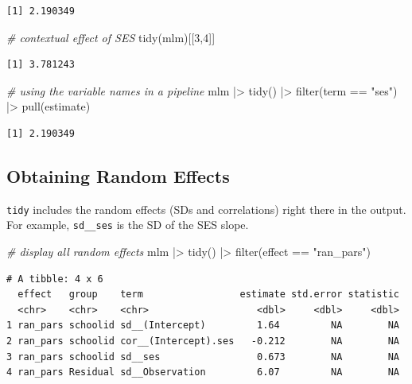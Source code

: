 \documentclass[
  letterpaper,
  DIV=11,
  numbers=noendperiod]{scrreprt}
\newenvironment{Shaded}{\begin{snugshade}}{\end{snugshade}}
\newcommand{\CommentTok}[1]{\textcolor[rgb]{0.38,0.63,0.69}{\textit{#1}}}
\newcommand{\DecValTok}[1]{\textcolor[rgb]{0.25,0.63,0.44}{#1}}
\newcommand{\FunctionTok}[1]{\textcolor[rgb]{0.02,0.16,0.49}{#1}}
\newcommand{\NormalTok}[1]{\textcolor[rgb]{0.00,0.44,0.13}{#1}}
\newcommand{\SpecialCharTok}[1]{\textcolor[rgb]{0.25,0.44,0.63}{#1}}
\newcommand{\StringTok}[1]{\textcolor[rgb]{0.25,0.44,0.63}{#1}}
\begin{document}
\begin{verbatim}
[1] 2.190349
\end{verbatim}

\begin{Shaded}
\begin{Highlighting}[]
\CommentTok{\# contextual effect of SES}
\FunctionTok{tidy}\NormalTok{(mlm)[[}\DecValTok{3}\NormalTok{,}\DecValTok{4}\NormalTok{]]}
\end{Highlighting}
\end{Shaded}

\begin{verbatim}
[1] 3.781243
\end{verbatim}

\begin{Shaded}
\begin{Highlighting}[]
\CommentTok{\# using the variable names in a pipeline}
\NormalTok{mlm }\SpecialCharTok{|\textgreater{}} 
  \FunctionTok{tidy}\NormalTok{() }\SpecialCharTok{|\textgreater{}} 
  \FunctionTok{filter}\NormalTok{(term }\SpecialCharTok{==} \StringTok{"ses"}\NormalTok{) }\SpecialCharTok{|\textgreater{}} 
  \FunctionTok{pull}\NormalTok{(estimate)}
\end{Highlighting}
\end{Shaded}

\begin{verbatim}
[1] 2.190349
\end{verbatim}

\hypertarget{obtaining-random-effects}{%
\subsection{Obtaining Random Effects}\label{obtaining-random-effects}}

\texttt{tidy} includes the random effects (SDs and correlations) right
there in the output. For example, \texttt{sd\_\_ses} is the SD of the
SES slope.

\begin{Shaded}
\begin{Highlighting}[]
\CommentTok{\# display all random effects}
\NormalTok{mlm }\SpecialCharTok{|\textgreater{}} 
  \FunctionTok{tidy}\NormalTok{() }\SpecialCharTok{|\textgreater{}} 
  \FunctionTok{filter}\NormalTok{(effect }\SpecialCharTok{==} \StringTok{"ran\_pars"}\NormalTok{)}
\end{Highlighting}
\end{Shaded}

\begin{verbatim}
# A tibble: 4 x 6
  effect   group    term                 estimate std.error statistic
  <chr>    <chr>    <chr>                   <dbl>     <dbl>     <dbl>
1 ran_pars schoolid sd__(Intercept)         1.64         NA        NA
2 ran_pars schoolid cor__(Intercept).ses   -0.212        NA        NA
3 ran_pars schoolid sd__ses                 0.673        NA        NA
4 ran_pars Residual sd__Observation         6.07         NA        NA
\end{verbatim}
\end{document}
